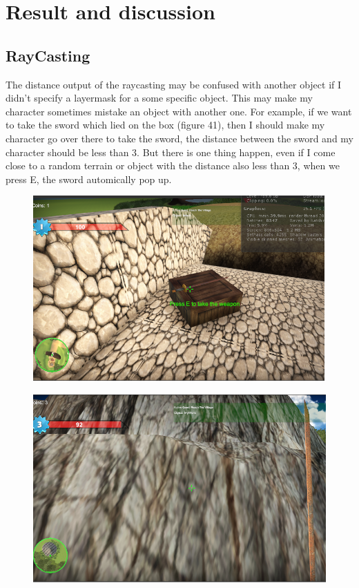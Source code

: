 \documentclass[a4paper, 13pt]{extarticle}
\begin{document}
{\section{Result and discussion}
\subsection{RayCasting} 
	The distance output of the raycasting may be confused with another object if I didn't specify a layermask for a some specific object. This may make my character sometimes mistake an object with another one. For example, if we want to take the sword which lied on the box (figure 41), then I should make my character go over there to take the sword, the distance between the sword and my character should be less than 3. But there is one thing happen, even if I come close to a random terrain or object with the distance also less than 3, when we press E, the sword automically pop up.
	\begin{figure}[h]
		\begin{minipage}{.5\textwidth}
			\centering
			\includegraphics[width=1\linewidth]{intructions/Take_weapon1.png}
			\label{fig:test39}
		\end{minipage}
		\begin{minipage}{.5\textwidth}
			\centering
			\includegraphics[width=1\linewidth]{intructions/Take_weapon2.png}

\end{minipage}
\end{figure}}
\end{document}
